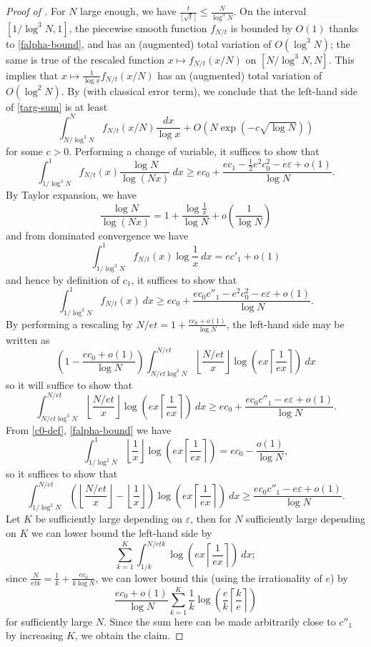 \documentclass[10pt,a4paper,reqno]{amsart}
\numberwithin{equation}{section}
\theoremstyle{plain}
\theoremstyle{definition}
\newcommand\eps{\varepsilon}
\begin{document}
\begin{proof}[Proof of ]
    For $N$ large enough, we have $\frac{t}{\lfloor\sqrt{t}\rfloor} \leq \frac{N}{\log^3 N}$.
    On the interval $[1/\log^3 N,1]$, the piecewise smooth function $f_{N/t}$ is bounded by $O(1)$ thanks to \eqref{falpha-bound}, and has an (augmented) total variation of $O(\log^3\! N)$; the same is true of the rescaled function $x \mapsto f_{N/t}(x/N)$ on $[N/\log^3\! N,N]$.   This implies that $x \mapsto \frac{1}{\log x} f_{N/t}(x/N)$ has an (augmented) total variation of $O(\log^2 N)$.
   By  (with classical error term), we conclude that the left-hand side of \eqref{targ-sum} is at least
    $$ \int_{N/\log^3 N}^N f_{N/t}(x/N) \frac{dx}{\log x} + O\left( N \exp(-c\sqrt{\log N}) \right)$$
    for some $c>0$.  Performing a change of variable, it suffices to show that
    $$  \int_{1/\log^3 N}^1 f_{N/t}(x) \frac{\log N}{\log(Nx)}\ dx
    \geq  ec_0 + \frac{ec_1 - \frac{1}{2} e^2 c_0^2 - e \eps + o(1)}{\log N}.$$
    By Taylor expansion, we have
    $$ \frac{\log N}{\log(Nx)} = 1 + \frac{\log \frac{1}{x}}{\log N}  + o\left(\frac{1}{\log N}\right)$$
    and from dominated convergence we have
  $$
  \int_{1/\log^3 N}^1 f_{N/t}(x) \log \frac{1}{x}\ dx = ec'_1 + o(1)$$
and hence by definition of $c_1$, it suffices to show that
$$  \int_{1/\log^3 N}^1 f_{N/t}(x)\ dx
\geq  ec_0 + \frac{ec_0 c''_1 - e^2 c_0^2 - e\eps + o(1)}{\log N}.$$
By performing a rescaling by $N/et = 1 + \frac{ec_0+o(1)}{\log N}$, the left-hand side may be written as
$$ \left(1 - \frac{ec_0+o(1)}{\log N}\right) \int_{N/et\log^3 N}^{N/et}
\left\lfloor \frac{N/et}{x} \right\rfloor \log\left(ex \left\lceil \frac{1}{ex} \right\rceil \right)\ dx$$
so it will suffice to show that
$$
\int_{N/et\log^3 N}^{N/et}
\left\lfloor \frac{N/et}{x} \right\rfloor \log\left(ex \left\lceil \frac{1}{ex} \right\rceil \right)\ dx \geq ec_0 + \frac{ec_0 c''_1 - e\eps + o(1)}{\log N}.$$
From \eqref{c0-def}, \eqref{falpha-bound} we have
$$ \int_{1/\log^2 N}^1 \left\lfloor \frac{1}{x} \right\rfloor \log\left(ex \left\lceil \frac{1}{ex} \right\rceil \right) = ec_0 - \frac{o(1)}{\log N},$$
so it suffices to show that
$$
\int_{1/\log^2 N}^{N/et}
\left(\left\lfloor \frac{N/et}{x} \right\rfloor - \left\lfloor \frac{1}{x} \right\rfloor\right) \log\left(ex \left\lceil \frac{1}{ex} \right\rceil \right)\ dx \geq \frac{ec_0 c''_1 - e\eps + o(1)}{\log N}.$$
Let $K$ be sufficiently large depending on $\eps$, then for $N$ sufficiently large depending on $K$ we can lower bound the left-hand side by
$$ \sum_{k=1}^K \int_{1/k}^{N/etk} \log\left(ex \left\lceil \frac{1}{ex} \right\rceil \right)\ dx;$$
since $\frac{N}{etk} = \frac{1}{k} + \frac{ec_0}{k \log N}$, we can lower bound this (using the irrationality of $e$) by
$$ \frac{ec_0+o(1)}{\log N} \sum_{k=1}^K \frac{1}{k} \log\left(\frac{e}{k} \left\lceil \frac{k}{e} \right\rceil\right)$$
for sufficiently large $N$.  Since the sum here can be made arbitrarily close to $c''_1$ by increasing $K$, we obtain the claim.
\end{proof}
\end{document}
